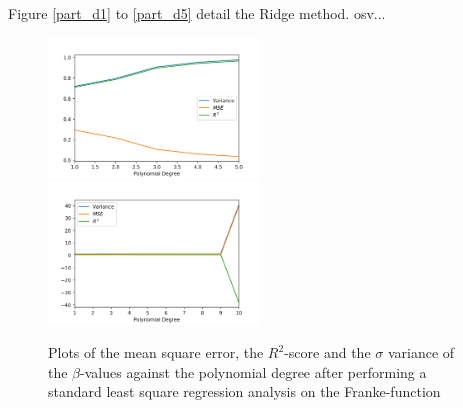 \documentclass[a4paper,10pt,english]{article}
\begin{document}
Figure \ref{part_d1} to \ref{part_d5} detail the Ridge method.
osv...


\begin{figure}[H]
	\centering 
	\includegraphics[width = 0.5\textwidth, center]{../franke_output/part_A.png}
	\includegraphics[width = 0.5\textwidth, center]{../franke_output/part_A_highdeg.png}
	\caption{
		Plots of the mean square error, the $R^2$-score and the $\sigma$ variance of the $\beta$-values against the polynomial degree after performing a standard least square regression analysis on the Franke-function
	}
	\label{part_a}
\end{figure}
\end{document}
